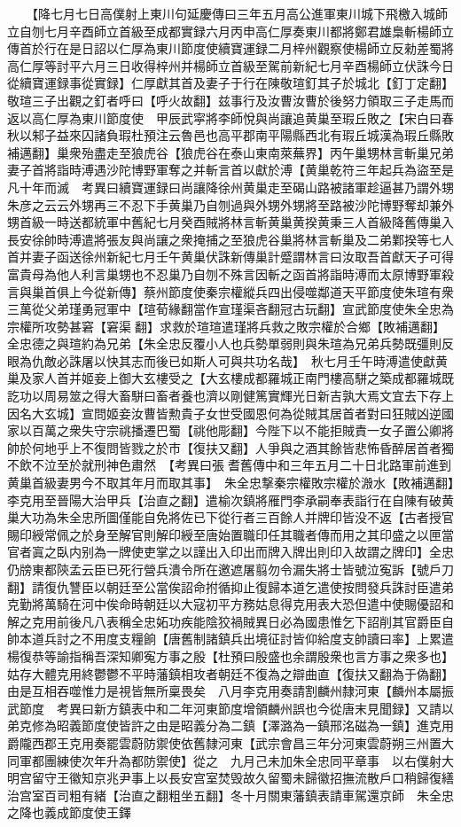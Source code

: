 　　【降七月七日高僕射上東川句延慶傳曰三年五月高公進軍東川城下飛檄入城師立自刎七月辛酉師立首級至成都實録六月丙申高仁厚奏東川都將鄭君雄梟斬楊師立傳首於行在是日詔以仁厚為東川節度使續寶運録二月梓州觀察使楊師立反勑差蜀將高仁厚等討平六月三日收得梓州并楊師立首級至駕前新紀七月辛酉楊師立伏誅今日從續寶運録事從實録】仁厚獻其首及妻子于行在陳敬瑄釘其子於城北【釘丁定翻】敬瑄三子出觀之釘者呼曰【呼火故翻】兹事行及汝曹汝曹於後努力領取三子走馬而返以高仁厚為東川節度使　甲辰武寜將李師悅與尚讓追黄巢至瑕丘敗之【宋白曰春秋以邾子益來囚諸負瑕杜預注云魯邑也高平郡南平陽縣西北有瑕丘城漢為瑕丘縣敗補邁翻】巢衆殆盡走至狼虎谷【狼虎谷在泰山東南萊蕪界】丙午巢甥林言斬巢兄弟妻子首將詣時溥遇沙陀博野軍奪之并斬言首以獻於溥【黄巢乾符三年起兵為盜至是凡十年而滅　考異曰續寶運録曰尚讓降徐州黄巢走至碣山路被諸軍趁逼甚乃謂外甥朱彦之云云外甥再三不忍下手黄巢乃自刎過與外甥外甥將至路被沙陀博野奪却兼外甥首級一時送都統軍中舊紀七月癸酉賊將林言斬黄巢黄揆黄秉三人首級降舊傳巢入長安徐帥時溥遣將張友與尚讓之衆掩捕之至狼虎谷巢將林言斬巢及二弟鄴揆等七人首并妻子函送徐州新紀七月壬午黄巢伏誅新傳巢計蹙謂林言曰汝取吾首獻天子可得富貴母為他人利言巢甥也不忍巢乃自刎不殊言因斬之函首將詣時溥而太原博野軍殺言與巢首俱上今從新傳】蔡州節度使秦宗權縱兵四出侵噬鄰道天平節度使朱瑄有衆三萬從父弟瑾勇冠軍中【瑄荀緣翻當作宣瑾渠吝翻冠古玩翻】宣武節度使朱全忠為宗權所攻勢甚窘【窘渠翻】求救於瑄瑄遣瑾將兵救之敗宗權於合鄉【敗補邁翻】全忠德之與瑄約為兄弟【朱全忠反覆小人也兵勢單弱則與朱瑄為兄弟兵勢既彊則反眼為仇敵必誅屠以快其志而後已如斯人可與共功名哉】　秋七月壬午時溥遣使獻黄巢及家人首并姬妾上御大玄樓受之【大玄樓成都羅城正南門樓高駢之築成都羅城既訖功以周易筮之得大畜駢曰畜者養也濟以剛健篤實輝光日新吉孰大焉文宜去下存上因名大玄城】宣問姬妾汝曹皆勲貴子女世受國恩何為從賊其居首者對曰狂賊凶逆國家以百萬之衆失守宗祧播遷巴蜀【祧他彫翻】今陛下以不能拒賊責一女子置公卿將帥於何地乎上不復問皆戮之於市【復扶又翻】人爭與之酒其餘皆悲怖昏醉居首者獨不飲不泣至於就刑神色肅然　【考異曰張耆舊傳中和三年五月二十日北路軍前進到黄巢首級妻男今不取其年月而取其事】　朱全忠撃秦宗權敗宗權於溵水【敗補邁翻】　李克用至晉陽大治甲兵【治直之翻】遣榆次鎮將雁門李承嗣奉表詣行在自陳有破黄巢大功為朱全忠所圖僅能自免將佐已下從行者三百餘人并牌印皆没不返【古者授官賜印綬常佩之於身至解官則解印綬至唐始置職印任其職者傳而用之其印盛之以匣當官者寘之臥内别為一牌使吏掌之以謹出入印出而牌入牌出則印入故謂之牌印】全忠仍牓東都陝孟云臣已死行營兵潰令所在邀遮屠翦勿令漏失將士皆號泣寃訴【號戶刀翻】請復仇讐臣以朝廷至公當俟詔命拊循抑止復歸本道乞遣使按問發兵誅討臣遣弟克勤將萬騎在河中俟命時朝廷以大寇初平方務姑息得克用表大恐但遣中使賜優詔和解之克用前後凡八表稱全忠妬功疾能陰狡禍賊異日必為國患惟乞下詔削其官爵臣自帥本道兵討之不用度支糧餉【唐舊制諸鎮兵出境征討皆仰給度支帥讀曰率】上累遣楊復恭等諭指稱吾深知卿寃方事之殷【杜預曰殷盛也余謂殷衆也言方事之衆多也】姑存大體克用終鬱鬱不平時藩鎮相攻者朝廷不復為之辯曲直【復扶又翻為于偽翻】由是互相吞噬惟力是視皆無所稟畏矣　八月李克用奏請割麟州隸河東【麟州本屬振武節度　考異曰新方鎮表中和二年河東節度增領麟州誤也今從唐末見聞録】又請以弟克修為昭義節度使皆許之由是昭義分為二鎮【澤潞為一鎮邢洺磁為一鎮】進克用爵隴西郡王克用奏罷雲蔚防禦使依舊隸河東【武宗會昌三年分河東雲蔚朔三州置大同軍都團練使次年升為都防禦使】從之　九月己未加朱全忠同平章事　以右僕射大明宫留守王徽知京兆尹事上以長安宫室焚毁故久留蜀未歸徽招撫流散戶口稍歸復繕治宫室百司粗有緒【治直之翻粗坐五翻】冬十月關東藩鎮表請車駕還京師　朱全忠之降也義成節度使王鐸